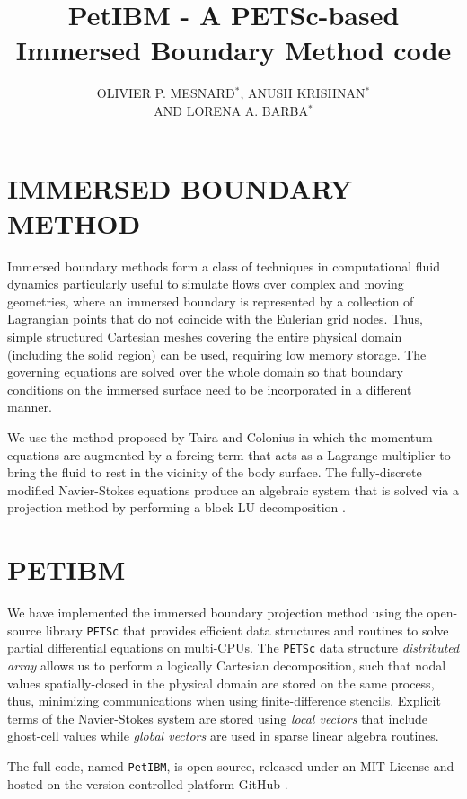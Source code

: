 \documentclass{parcfd2015}
\title{PetIBM - A PETSc-based Immersed Boundary Method code}
\author{OLIVIER P. MESNARD$^{*}$, ANUSH KRISHNAN$^{*}$ \\ AND LORENA A. BARBA$^{*}$}
\begin{document}
\maketitle

\section{IMMERSED BOUNDARY METHOD}

Immersed boundary methods form a class of techniques in computational fluid dynamics particularly useful to simulate flows over complex and moving geometries, where an immersed boundary is represented by a collection of Lagrangian points that do not coincide with the Eulerian grid nodes. Thus, simple structured Cartesian meshes covering the entire physical domain (including the solid region) can be used, requiring low memory storage. The governing equations are solved over the whole domain so that boundary conditions on the immersed surface need to be incorporated in a different manner.

We use the method proposed by Taira and Colonius \cite{Taira_Colonius_2007} in which the momentum equations are augmented by a forcing term that acts as a Lagrange multiplier to bring the fluid to rest in the vicinity of the body surface. The fully-discrete modified Navier-Stokes equations produce an algebraic system  that is solved via a projection method by performing a block LU decomposition \cite{Perot_1993}.

\section{PETIBM}

We have implemented the immersed boundary projection method using the open-source library \texttt{PETSc} \cite{PETSc_webpage_2014} that provides efficient data structures and routines to solve partial differential equations on multi-CPUs. The \texttt{PETSc} data structure \textit{distributed array} allows us to perform a logically Cartesian decomposition, such that nodal values spatially-closed in the physical domain are stored on the same process, thus, minimizing communications when using finite-difference stencils. Explicit terms of the Navier-Stokes system are stored using \textit{local vectors} that include ghost-cell values while \textit{global vectors} are used in sparse linear algebra routines.

The full code, named \texttt{PetIBM}, is open-source, released under an MIT License and hosted on the version-controlled platform GitHub \cite{PetIBM}.
\end{document}
